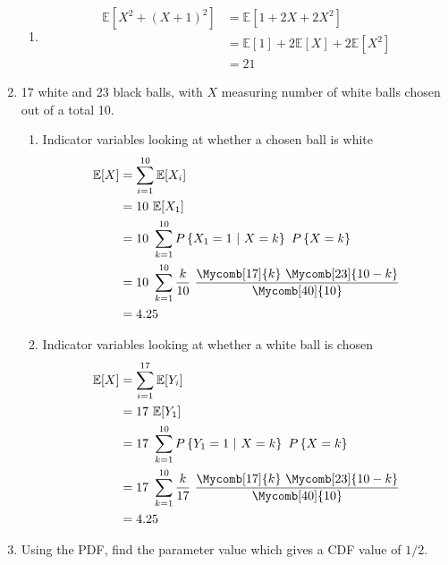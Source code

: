 \begin{enumerate}
\begin{enumerate}
			\item \begin{align}
				\mathbb{E}[X^2 + (X + 1)^2] &= \mathbb{E}[1 + 2X + 2X^2] \nonumber \\
				&= \mathbb{E}[1] + 2 \mathbb{E}[X] + 2 \mathbb{E}[X^2] \nonumber \\
				&= 21
			\end{align}
			
		\end{enumerate}
	
	
	\item 17 white and 23 black balls, with $ X $ measuring number of white balls chosen out of a total 10.
	
		\begin{enumerate}
			
			\item Indicator variables looking at whether a chosen ball is white
			\begin{align}
				\mathbb{E}[X] &= \sum\limits_{i = 1}^{10} \mathbb{E}[X_i] \nonumber \\
				&= 10\ \mathbb{E}[X_1] \nonumber \\
				&= 10\ \sum\limits_{k = 1}^{10} P \left\{ X_1 = 1\ |\ X = k \right\} \ P\left\{X = k\right\} \nonumber \\
				&= 10\ \sum\limits_{k = 1}^{10} \frac{k}{10} \ \frac{\Mycomb[17]{k}\ \Mycomb[23]{10-k}}{\Mycomb[40]{10}} \nonumber \\
				&= 4.25
			\end{align}
			
			\item Indicator variables looking at whether a white ball is chosen
			\begin{align}
				\mathbb{E}[X] &= \sum\limits_{i = 1}^{17} \mathbb{E}[Y_i] \nonumber \\
				&= 17\ \mathbb{E}[Y_1] \nonumber \\
				&= 17\ \sum\limits_{k = 1}^{10} P \left\{ Y_1 = 1\ |\ X = k \right\} \ P\left\{X = k\right\} \nonumber \\
				&= 17\ \sum\limits_{k = 1}^{10} \frac{k}{17} \ \frac{\Mycomb[17]{k}\ \Mycomb[23]{10-k}}{\Mycomb[40]{10}} \nonumber \\
				&= 4.25
			\end{align}
			
		\end{enumerate}
	
	
	\item Using the PDF, find the parameter value which gives a CDF value of $ 1/2 $.
	

\end{enumerate}
